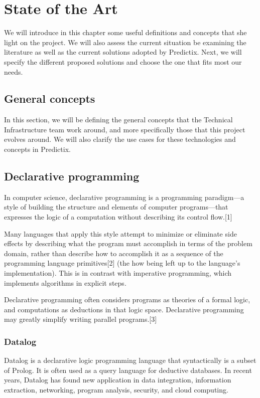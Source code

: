 \chapter{State of the Art}
We will introduce in this chapter some useful definitions and concepts that she
light on  the project. We will also assess the current situation be examining
the literature as well as the current solutions adopted by Predictix. Next, we
will specify the different proposed solutions and choose the one that fits most
our needs.



\section{General concepts}

In this section, we will be defining the general concepts that the Technical
Infrastructure team work around, and more specifically those that this project
evolves around. We will also clarify the use cases for these technologies and
concepts in Predictix.

\section{Declarative programming}
In computer science, declarative programming is a programming paradigm—a style
of building the structure and elements of computer programs—that expresses the
logic of a computation without describing its control flow.[1]

Many languages that apply this style attempt to minimize or eliminate side
effects by describing what the program must accomplish in terms of the problem
domain, rather than describe how to accomplish it as a sequence of the
programming language primitives[2] (the how being left up to the language's
implementation). This is in contrast with imperative programming, which
implements algorithms in explicit steps.

Declarative programming often considers programs as theories of a formal logic,
and computations as deductions in that logic space. Declarative programming may
greatly simplify writing parallel programs.[3]

\subsection{Datalog}
Datalog is a declarative logic programming language that syntactically is a
subset of Prolog. It is often used as a query language for deductive databases.
In recent years, Datalog has found new application in data integration,
information extraction, networking, program analysis, security, and cloud
computing.

